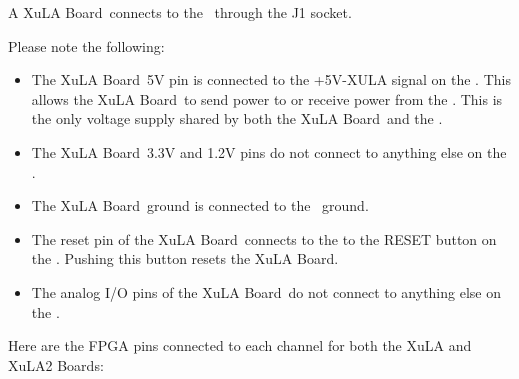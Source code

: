\documentclass[letterpaper,11pt,oneside]{memoir}
\newcommand{\xula}{XuLA Board}
\begin{document}
A \xula\ connects to the \product\ through the J1 socket.


Please note the following:

\begin{itemize}
\item The \xula\ 5V pin is connected to the +5V-XULA signal on the \product.
	This allows the \xula\ to send power to or receive power from the \product.
	This is the only voltage supply shared by both the \xula\ and the \product.
\item The \xula\ 3.3V and 1.2V pins do not connect to anything else on the \product.
\item The \xula\ ground is connected to the \product\ ground.
\item The reset pin of the \xula\ connects to the to the RESET button 
	on the \product. Pushing this button resets the \xula.
\item The analog I/O pins of the \xula\ do not connect to anything else 
	on the \product.
\end{itemize}

Here are the FPGA pins connected to each channel for both the XuLA and XuLA2 Boards:
\end{document}
